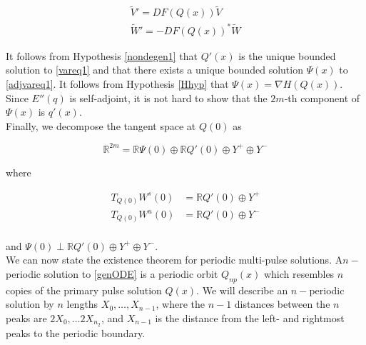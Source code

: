 \documentclass[12pt]{article}
\def\R{{\mathbb R}}
\begin{document}
\begin{align}
\tilde{V}' = DF(Q(x))\tilde{V} \label{vareq1} \\
\tilde{W}' = -DF(Q(x))^* \tilde{W} \label{adjvareq1}
\end{align}

It follows from Hypothesis \ref{nondegen1} that $Q'(x)$ is the unique bounded solution to \eqref{vareq1} and that there exists a unique bounded solution $\Psi(x)$ to \eqref{adjvareq1}. It follows from Hypothesis \ref{Hhyp} that $\Psi(x) = \nabla H(Q(x))$. Since $E''(q)$ is self-adjoint, it is not hard to show that the $2m$-th component of $\Psi(x)$ is $q'(x)$.\\

Finally, we decompose the tangent space at $Q(0)$ as 

\begin{equation}
\R^{2m} = \R \Psi(0) \oplus \R Q'(0) \oplus Y^+ \oplus Y^-
\end{equation}

where

\begin{align*}
T_{Q(0)}W^s(0) &= \R Q'(0) \oplus Y^+ \\
T_{Q(0)}W^u(0) &= \R Q'(0) \oplus Y^- \\
\end{align*}

and $\Psi(0) \perp \R Q'(0) \oplus Y^+ \oplus Y^-$.\\

We can now state the existence theorem for periodic multi-pulse solutions. A$n-$periodic solution to \eqref{genODE} is a periodic orbit $Q_{np}(x)$ which resembles $n$ copies of the primary pulse solution $Q(x)$. We will describe an $n-$periodic solution by $n$ lengths $X_0, \dots, X_{n-1}$, where the $n-1$ distances between the $n$ peaks are $2X_0, \dots 2X_{n_2}$, and $X_{n-1}$ is the distance from the left- and rightmost peaks to the periodic boundary.
\end{document}
